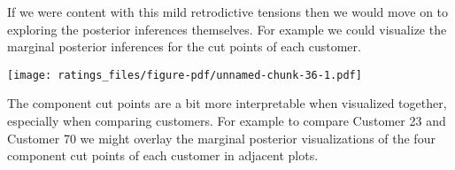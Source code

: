 \documentclass[
  letterpaper,
  DIV=11,
  numbers=noendperiod]{scrartcl}
\newenvironment{Shaded}{\begin{snugshade}}{\end{snugshade}}
\newcommand{\AttributeTok}[1]{\textcolor[rgb]{0.40,0.45,0.13}{#1}}
\newcommand{\ControlFlowTok}[1]{\textcolor[rgb]{0.00,0.23,0.31}{#1}}
\newcommand{\DecValTok}[1]{\textcolor[rgb]{0.68,0.00,0.00}{#1}}
\newcommand{\FunctionTok}[1]{\textcolor[rgb]{0.28,0.35,0.67}{#1}}
\newcommand{\NormalTok}[1]{\textcolor[rgb]{0.00,0.23,0.31}{#1}}
\newcommand{\OtherTok}[1]{\textcolor[rgb]{0.00,0.23,0.31}{#1}}
\newcommand{\SpecialCharTok}[1]{\textcolor[rgb]{0.37,0.37,0.37}{#1}}
\newcommand{\StringTok}[1]{\textcolor[rgb]{0.13,0.47,0.30}{#1}}
\begin{document}
If we were content with this mild retrodictive tensions then we would
move on to exploring the posterior inferences themselves. For example we
could visualize the marginal posterior inferences for the cut points of
each customer.

\begin{Shaded}
\end{Shaded}

\texttt{[image: ratings\_files/figure-pdf/unnamed-chunk-36-1.pdf]}

The component cut points are a bit more interpretable when visualized
together, especially when comparing customers. For example to compare
Customer 23 and Customer 70 we might overlay the marginal posterior
visualizations of the four component cut points of each customer in
adjacent plots.
\end{document}
